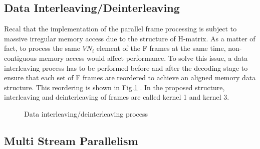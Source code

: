 \documentclass[10pt,a4paper]{article}
\begin{document}
\subsection{Data Interleaving/Deinterleaving}
Recal that the implementation of the parallel frame processing is subject to massive irregular memory access due to the structure of H-matrix. As a matter of fact, to process the same $VN_i$ element of the F frames at the same time, non-contiguous memory access would affect performance. To solve this issue, a data interleaving process has to be performed before and after the decoding stage to ensure that each set of F frames are reordered to achieve an aligned memory data structure. This reordering is shown in Fig.\ref{fig_intreleave} \cite{art_ldpc_cpu1}. In the proposed structure, interleaving and deinterleaving of frames are called {kernel 1} and {kernel 3}.

\begin{figure}[H]
\begin{centering}
\caption[width=.3\textwidth]{Data interleaving/deinterleaving process\cite{art_ldpc_cpu1}}
\label{fig_intreleave}
\end{centering}
\end{figure}

\subsection{Multi Stream Parallelism}\label{subsec_proposed}
\end{document}
